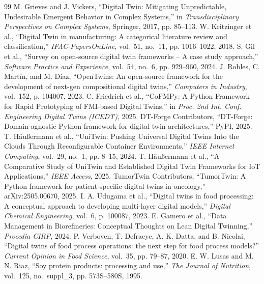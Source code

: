 \documentclass[10pt,letterpaper,twocolumn]{article}
\begin{document}
\begin{thebibliography}{99}
\footnotesize
{} M. Grieves and J. Vickers, ``Digital Twin: Mitigating Unpredictable, Undesirable Emergent Behavior in Complex Systems,'' in \textit{Transdisciplinary Perspectives on Complex Systems}, Springer, 2017, pp. 85--113.
 W. Kritzinger et al., ``Digital Twin in manufacturing: A categorical literature review and classification,'' \textit{IFAC-PapersOnLine}, vol.~51, no.~11, pp. 1016--1022, 2018.
 S. Gil et al., ``Survey on open-source digital twin frameworks -- A case study approach,'' \textit{Software Practice and Experience}, vol.~54, no.~6, pp. 929--960, 2024.
 J. Robles, C. Mart\'in, and M. D\'iaz, ``OpenTwins: An open-source framework for the development of next-gen compositional digital twins,'' \textit{Computers in Industry}, vol.~152, p. 104007, 2023.
 C. Friedrich et al., ``CoFMPy: A Python Framework for Rapid Prototyping of FMI-based Digital Twins,'' in \textit{Proc. 2nd Int. Conf. Engineering Digital Twins (ICEDT)}, 2025.
 DT-Forge Contributors, ``DT-Forge: Domain-agnostic Python framework for digital twin architectures,'' PyPI, 2025.
 T. H\"au{\ss}ermann et al., ``UniTwin: Pushing Universal Digital Twins Into the Clouds Through Reconfigurable Container Environments,'' \textit{IEEE Internet Computing}, vol.~29, no.~1, pp. 8--15, 2024.
 T. H\"au{\ss}ermann et al., ``A Comparative Study of UniTwin and Established Digital Twin Frameworks for IoT Applications,'' \textit{IEEE Access}, 2025.
 TumorTwin Contributors, ``TumorTwin: A Python framework for patient-specific digital twins in oncology,'' arXiv:2505.00670, 2025.
 I. A. Udugama et al., ``Digital twins in food processing: A conceptual approach to developing multi-layer digital models,'' \textit{Digital Chemical Engineering}, vol.~6, p. 100087, 2023.
 E. Gamero et al., ``Data Management in Biorefineries: Conceptual Thoughts on Lean Digital Twinning,'' \textit{Procedia CIRP}, 2024.
 P. Verboven, T. Defraeye, A. K. Datta, and B. Nicolai, ``Digital twins of food process operations: the next step for food process models?'' \textit{Current Opinion in Food Science}, vol.~35, pp. 79--87, 2020.
 E. W. Lusas and M. N. Riaz, ``Soy protein products: processing and use,'' \textit{The Journal of Nutrition}, vol.~125, no.~suppl\_3, pp. 573S--580S, 1995.

\end{thebibliography}
\end{document}
